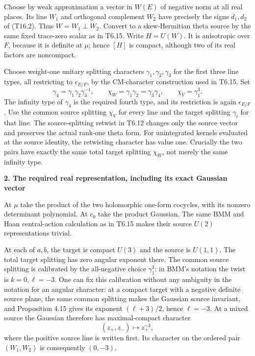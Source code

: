 \documentclass[11pt,a4paper]{article}
\theoremstyle{definition}
\begin{document}
Choose by weak approximation a vector in \(W(E)\) of negative norm at all real places. Its line \(W_1\) and orthogonal complement \(W_2\) have precisely the signs \(d_1,d_2\) of (T16.2). Thus \(W=W_1\perp W_2\). Convert to a skew-Hermitian theta source by the same fixed trace-zero scalar as in T6.15. Write \(H=U(W)\). It is anisotropic over \(F\), because it is definite at \(\mu\); hence \([H]\) is compact, although two of its real factors are noncompact.

Choose weight-one unitary splitting characters \(\gamma_1,\gamma_2,\gamma_3\) for the first three line types, all restricting to \(\epsilon_{E/F}\), by the CM-character construction used in T6.15. Set \[
\gamma_4=\gamma_1\gamma_2\gamma_3^{-1},\qquad
\chi_W=\gamma_1\gamma_2=\gamma_3\gamma_4,\qquad
\chi_V=\gamma_1^3.
\tag{T16.3}
\] The infinity type of \(\gamma_4\) is the required fourth type, and its restriction is again \(\epsilon_{E/F}\). Use the common source splitting \(\chi_V\) for every line and the target splitting \(\gamma_i\) for that line. The source-splitting retwist in T6.12 changes only the source vector and preserves the actual rank-one theta form. For unintegrated kernels evaluated at the source identity, the retwisting character has value one. Crucially the two pairs have exactly the same total target splitting \(\chi_W\), not merely the same infinity type.

\textbf{2. The required real representation, including its exact Gaussian vector}

At \(\mu\) take the product of the two holomorphic one-form cocycles, with its nonzero determinant polynomial. At \(c_0\) take the product Gaussian. The same BMM and Haan central-action calculation as in T6.15 makes their source \(U(2)\) representations trivial.

At each of \(a,b\), the target is compact \(U(3)\) and the source is \(U(1,1)\). The total target splitting has zero angular exponent there. The common source splitting is calibrated by the all-negative choice \(\gamma_1^3\): in BMM's notation the twist is \(k=0,\ell=-3\). One can fix this calibration without any ambiguity in the notation for an angular character: at a compact target with a negative definite source plane, the same common splitting makes the Gaussian source invariant, and Proposition 4.15 gives its exponent \((\ell+3)/2\), hence \(\ell=-3\). At a mixed source the Gaussian therefore has maximal-compact character \[
(z_+,z_-)\longmapsto z_+^{-3},
\tag{T16.4}
\] where the positive source line is written first. Its character on the ordered pair \((W_1,W_2)\) is consequently \((0,-3)\).
\end{document}
